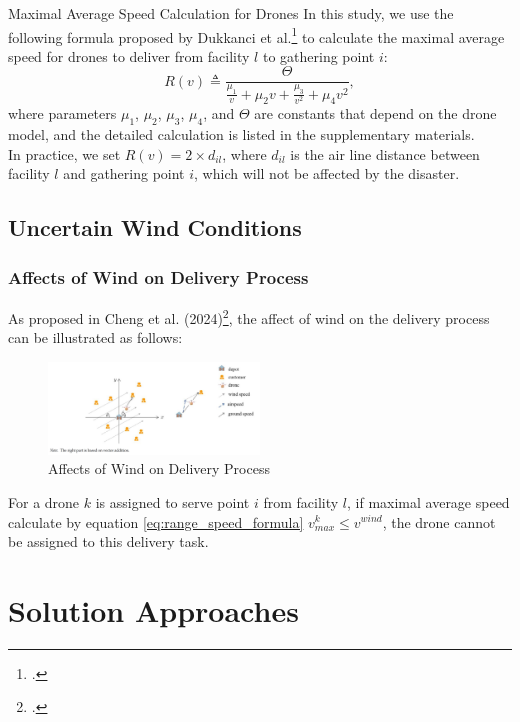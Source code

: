 \documentclass[aspectratio=169]{beamer}
\begin{document}
\begin{frame}{Maximal Average Speed Calculation for Drones}
In this study, we use the following formula proposed by Dukkanci et al.\footcites{dukkanci2021energyandcost} to calculate the maximal average speed for drones to deliver from facility $l$ to gathering point $i$:
\begin{equation}
    R(v) \triangleq \frac{\Theta}{\frac{\mu_1}{v} + \mu_2 v + \frac{\mu_3}{v^2} + \mu_4 v^2}, \label{eq:range_speed_formula}
\end{equation}
where parameters $\mu_1$, $\mu_2$, $\mu_3$, $\mu_4$, and $\Theta$ are constants that depend on the drone model, and the detailed calculation is listed in the supplementary materials. \\
\vspace{1em}
In practice, we set $R(v) = 2 \times d_{il}$, where $d_{il}$ is the air line distance between facility $l$ and gathering point $i$, which will not be affected by the disaster.
\end{frame}


\subsection{Uncertain Wind Conditions}
\begin{frame}\frametitle{Affects of Wind on Delivery Process}
As proposed in Cheng et al. (2024)\footcite{cheng2024robust}, the affect of wind on the delivery process can be illustrated as follows:
\begin{figure}[h]
    \centering
    \includegraphics[width=0.5\textwidth]{figure_windspeed.png}
    \caption{Affects of Wind on Delivery Process}
    \label{fig:wind_affect}
\end{figure}
\vspace{-10pt}
For a drone $k$ is assigned to serve point $i$ from facility $l$, if maximal average speed calculate by equation \eqref{eq:range_speed_formula} $v^k_{max} \leq v^{wind}$, the drone cannot be assigned to this delivery task.
\end{frame}

\section{Solution Approaches}
\end{document}
